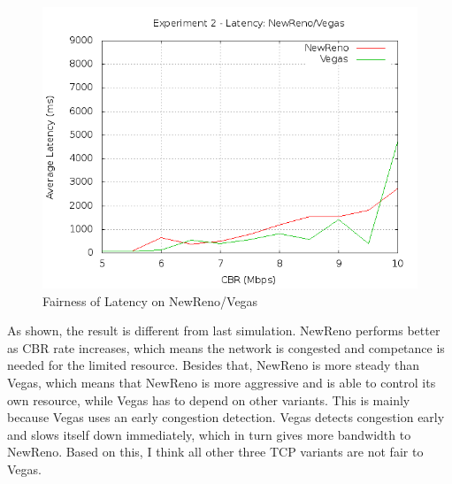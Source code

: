 \documentclass[10pt, conference]{lib/IEEEtran}
\begin{document}
\begin{figure}[H]
    \centering
    \includegraphics[width=0.9\linewidth]{plot/exp2-lt-NewReno-Vegas.png}
    \caption{Fairness of Latency on NewReno/Vegas}
    \label{fig:exp2_lt_nv}
\end{figure}
As shown, the result is different from last simulation. NewReno
 performs better as CBR rate increases, which means the network is 
 congested and competance is needed for the limited resource. Besides 
 that, NewReno is more steady than Vegas, which means that NewReno is 
 more aggressive and is able to control its own resource, while Vegas
 has to depend on other variants. This is mainly because Vegas uses an
 early congestion detection. Vegas detects congestion early and slows 
 itself down immediately, which in turn gives more bandwidth to NewReno.
 Based on this, I think all other three TCP variants are not fair to Vegas.
\end{document}
